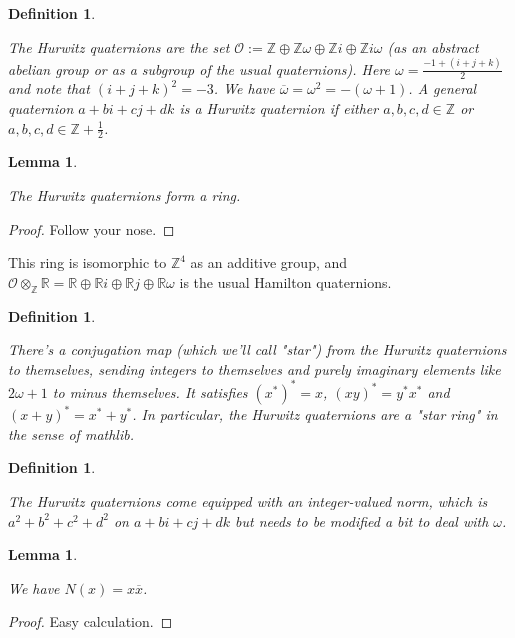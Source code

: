 \documentclass[10pt,a4paper]{article}
\newcommand{\Z}{\mathbb{Z}}
\newcommand{\R}{\mathbb{R}}
\newcommand{\calO}{\mathcal{O}}
\newtheorem{lemma}[theorem]{Lemma}
\newtheorem{definition}[theorem]{Definition}
\newcommand{\uses}[1]{}
\newcommand{\lean}[1]{}
\newcommand{\leanok}{}
\begin{document}
\begin{definition}
    \label{Hurwitz}
    \lean{Hurwitz}
    \leanok
        The Hurwitz quaternions are the set $\calO := \Z\oplus\Z \omega\oplus\Z i\oplus
    \Z i\omega$ (as an abstract abelian group or as a subgroup of the usual quaternions).
    Here $\omega=\frac{-1+(i+j+k)}{2}$ and note that $(i+j+k)^2=-3$.
    We have $\overline{\omega}=\omega^2=-(\omega+1)$. A general quaternion
    $a+bi+cj+dk$ is a Hurwitz quaternion if either $a,b,c,d\in\Z$
    or $a,b,c,d\in\Z+\frac{1}{2}$.
\end{definition}

\begin{lemma}
    \label{Hurwitz.ring}
    \lean{Hurwitz.ring}
    \uses{Hurwitz}
    \leanok
    The Hurwitz quaternions form a ring.
\end{lemma}
\begin{proof}
    \leanok
    Follow your nose.
\end{proof}


This ring is isomorphic to $\Z^4$ as an additive group, and
$\calO\otimes_{\Z}\R=\R\oplus \R i\oplus \R j\oplus\R \omega$
is the usual Hamilton quaternions.

\begin{definition}
    \label{Hurwitz.starRing}
    \lean{Hurwitz.starRing}
    \uses{Hurwitz.ring}
    \leanok
    There's a conjugation map (which we'll call "star") from the Hurwitz quaternions to themselves, sending
    integers to themselves and purely imaginary elements like $2\omega+1$ to minus themselves.
    It satisfies $(x^*)^*=x$, $(xy)^*=y^*x^*$ and $(x+y)^*=x^*+y^*$. In particular, the Hurwitz
    quaternions are a "star ring" in the sense of mathlib.
\end{definition}

\begin{definition}
    \label{Hurwitz.norm}
    \lean{Hurwitz.norm}
    \uses{Hurwitz}
    \leanok
    The Hurwitz quaternions come equipped with an integer-valued norm, which is
    $a^2+b^2+c^2+d^2$ on $a+bi+cj+dk$ but needs to be modified a bit to deal with $\omega$.
\end{definition}

\begin{lemma}
    \label{Hurwitz.norm_eq_mul_conj}
    \lean{Hurwitz.norm_eq_mul_conj}
    \leanok
    We have $N(x)=x\overline{x}$.
\end{lemma}
\begin{proof}
    \uses{Hurwitz.norm, Hurwitz.starRing}
    \leanok
    Easy calculation.
\end{proof}
\end{document}

